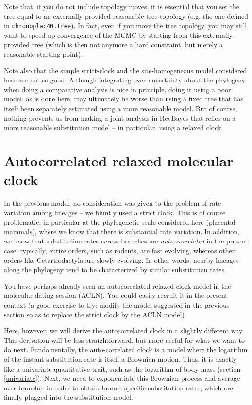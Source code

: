 \documentclass[usletter]{article}
\newcommand{\cmd}[1]{\texttt{#1}}
\begin{document}
Note that, if you do not include topology moves, it is essential that you 
set the tree equal to an externally-provided reasonable tree topology (e.g. the one defined in \cmd{chronoplac40.tree}).
In fact, even if you move the tree topology,
you may still want to speed up convergence of the MCMC by starting from this externally-provided tree
(which is then not anymore a hard constraint, but merely a reasonable starting point).

Note also that the simple strict-clock and the site-homogeneous model considered here are not so good.
Although integrating over uncertainty about the phylogeny when doing a comparative analysis is nice in principle,
doing it using a poor model, as is done here,
may ultimately be worse than using a fixed tree that has itself been separately estimated using a more reasonable model.
But of course, nothing prevents us from making a joint analysis in RevBayes
that relies on a more reasonable substitution model -- in particular, using a relaxed clock.

\section{Autocorrelated relaxed molecular clock}

In the previous model, no consideration was given to the problem of rate variation among lineages --
we bluntly used a strict clock. This is of course problematic, in particular at the phylogenetic scale considered here (placental mammals), where we know that there is substantial rate variation. In addition, we know that substitution rates across branches are \emph{auto-correlated} in the present case: typically, entire orders, such as rodents, are fast evolving, whereas other orders like Cetartiodactyla are slowly evolving. In other words, nearby lineages along the phylogeny tend to be characterized by similar substitution rates.

You have perhaps already seen an autocorrelated relaxed clock model in the molecular dating session (ACLN). You could easily recruit it in the present context (a good exercise to try: modify the model suggested in the previous section so as to replace the strict clock by the ACLN model).

Here, however, we will derive the autocorrelated clock in a slightly different way. This derivation will be less straightforward, but more useful for what we want to do next.
Fundamentally, the auto-correlated clock is a model where the logarithm of the instant substitution rate is itself a Brownian motion. Thus, it is exactly like a univariate quantitative trait, such as the logarithm of body mass (section \ref{univariate}). Next, we need to exponentiate this Brownian process and average over branches in order to obtain branch-specific substitution rates, which are finally plugged into the substitution model.
\end{document}
